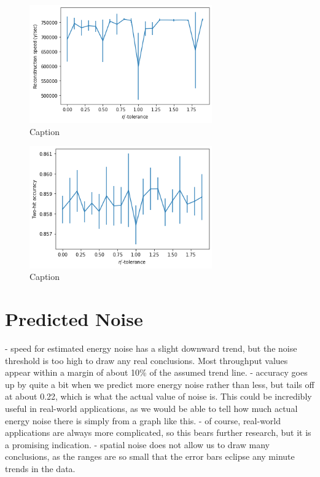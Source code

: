 \begin{figure}
    \centering
    \includegraphics[width=0.7\textwidth]{graphs/pi_eta_speed.png}
    \caption{Caption}
    \label{fig:my_label}
\end{figure}

\begin{figure}
    \centering
    \includegraphics[width=0.7\textwidth]{graphs/pi_eta_acc.png}
    \caption{Caption}
    \label{fig:my_label}
\end{figure}

\section{Predicted Noise}
- speed for estimated energy noise has a slight downward trend, but the noise threshold is too high to draw any real conclusions. Most throughput values appear within a margin of about 10\%  of the assumed trend line.
- accuracy goes up by quite a bit when we predict more energy noise rather than less, but tails off at about 0.22, which is what the actual value of noise is. This could be incredibly useful in real-world applications, as we would be able to tell how much actual energy noise there is simply from a graph like this.
- of course, real-world applications are always more complicated, so this bears further research, but it is a promising indication.
- spatial noise does not allow us to draw many conclusions, as the ranges are so small that the error bars eclipse any minute trends in the data. 

